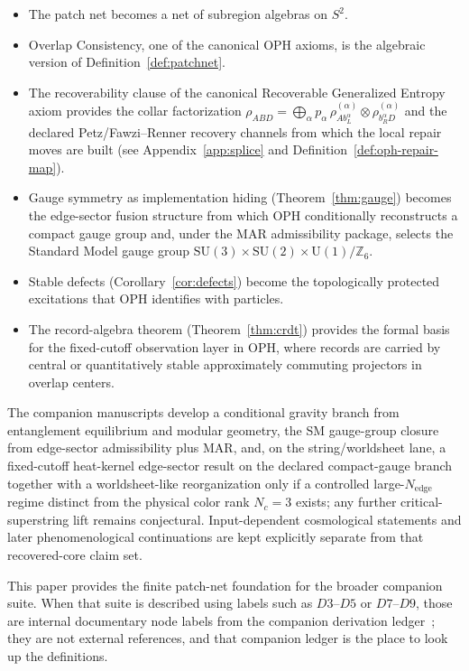 \documentclass[11pt]{article}
\theoremstyle{remark}
\theoremstyle{plain}
\begin{document}
\begin{itemize}
\item The patch net becomes a net of subregion algebras on $S^2$.
\item Overlap Consistency, one of the canonical OPH axioms, is the algebraic version of Definition~\ref{def:patchnet}.
\item The recoverability clause of the canonical Recoverable Generalized Entropy axiom provides the collar factorization $\rho_{ABD} = \bigoplus_\alpha p_\alpha\,\rho^{(\alpha)}_{Ab_L^\alpha}\otimes\rho^{(\alpha)}_{b_R^\alpha D}$ and the declared Petz/Fawzi--Renner recovery channels from which the local repair moves are built (see Appendix~\ref{app:splice} and Definition~\ref{def:oph-repair-map}).
\item Gauge symmetry as implementation hiding (Theorem~\ref{thm:gauge}) becomes the edge-sector fusion structure from which OPH conditionally reconstructs a compact gauge group and, under the MAR admissibility package, selects the Standard Model gauge group $\mathrm{SU}(3)\times\mathrm{SU}(2)\times\mathrm{U}(1)/\mathbb{Z}_6$.
\item Stable defects (Corollary~\ref{cor:defects}) become the topologically protected excitations that OPH identifies with particles.
\item The record-algebra theorem (Theorem~\ref{thm:crdt}) provides the formal basis for the fixed-cutoff observation layer in OPH, where records are carried by central or quantitatively stable approximately commuting projectors in overlap centers.
\end{itemize}

The companion manuscripts develop a conditional gravity branch from entanglement equilibrium and modular geometry, the SM gauge-group closure from edge-sector admissibility plus MAR, and, on the string/worldsheet lane, a fixed-cutoff heat-kernel edge-sector result on the declared compact-gauge branch together with a worldsheet-like reorganization only if a controlled large-$N_{\mathrm{edge}}$ regime distinct from the physical color rank $N_c=3$ exists; any further critical-superstring lift remains conjectural. Input-dependent cosmological statements and later phenomenological continuations are kept explicitly separate from that recovered-core claim set.

This paper provides the finite patch-net foundation for the broader companion suite. When that
suite is described using labels such as \(D3\)--\(D5\) or \(D7\)--\(D9\), those are internal
documentary node labels from the companion derivation ledger~\cite{OPH}; they are not external
references, and that companion ledger is the place to look up the definitions.
\end{document}
